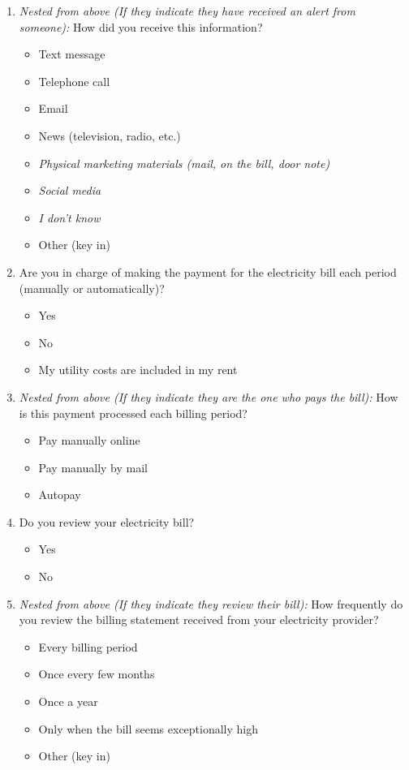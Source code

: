 \documentclass{article}
\begin{document}
\begin{enumerate}
\item \textit{Nested from above (If they indicate they have received an alert from someone):}
How did you receive this information?
\begin{itemize}
  \item[\checkbox] Text message
  \item[\checkbox] Telephone call
  \item[\checkbox] Email
  \item[\checkbox] News (television, radio, etc.)
  \item[\checkbox] \textit{Physical marketing materials (mail, on the bill, door note)}
  \item[\checkbox] \textit{Social media}
  \item[\checkbox] \textit{I don't know}
  \item[\checkbox] Other (key in)
\end{itemize}
 

\item Are you in charge of making the payment for the electricity bill each period (manually or automatically)?
\begin{itemize}
  \item[\checkbox] Yes
  \item[\checkbox] No
  \item[\checkbox] My utility costs are included in my rent
\end{itemize}
 

\item \textit{Nested from above (If they indicate they are the one who pays the bill):}
How is this payment processed each billing period?
\begin{itemize}
  \item[\checkbox] Pay manually online
  \item[\checkbox] Pay manually by mail
  \item[\checkbox] Autopay
\end{itemize}
 

\item Do you review your electricity bill?
\begin{itemize}
  \item[\checkbox] Yes
  \item[\checkbox] No
\end{itemize}
 

\item \textit{Nested from above (If they indicate they review their bill):}
How frequently do you review the billing statement received from your electricity provider?
\begin{itemize}
  \item[\checkbox] Every billing period
  \item[\checkbox] Once every few months
  \item[\checkbox] Once a year
  \item[\checkbox] Only when the bill seems exceptionally high
  \item[\checkbox] Other (key in)
\end{itemize}
 


\end{enumerate}
\end{document}
